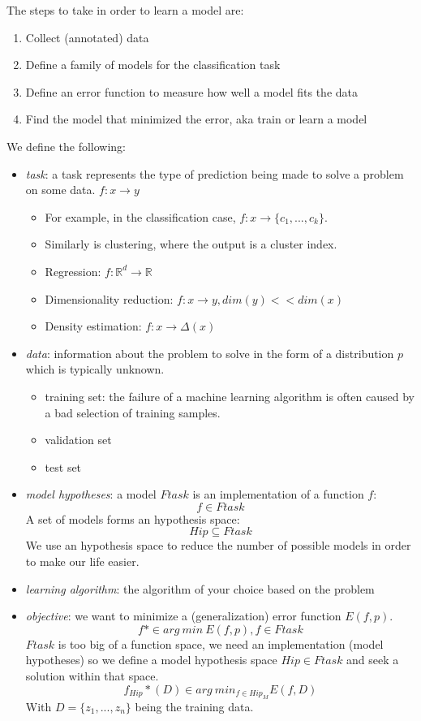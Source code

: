 \documentclass{article}
\begin{document}
The steps to take in order to learn a model are:

\begin{enumerate}
\def\labelenumi{\arabic{enumi}.}
\tightlist
\item
  Collect (annotated) data
\item
  Define a family of models for the classification task
\item
  Define an error function to measure how well a model fits the data
\item
  Find the model that minimized the error, aka train or learn a model
\end{enumerate}

We define the following:

\begin{itemize}
\tightlist
\item
  \emph{task}: a task represents the type of prediction being made to
  solve a problem on some data. \(f: x \rightarrow y\)

  \begin{itemize}
  \tightlist
  \item
    For example, in the classification case,
    \(f: x \rightarrow \{c_1, ..., c_k \}\).
  \item
    Similarly is clustering, where the output is a cluster index.
  \item
    Regression: \(f: \mathbb{R}^d \rightarrow \mathbb{R}\)
  \item
    Dimensionality reduction: \(f: x \rightarrow y, dim(y) << dim(x)\)
  \item
    Density estimation: \(f: x \rightarrow \Delta (x)\)
  \end{itemize}
\item
  \emph{data}: information about the problem to solve in the form of a
  distribution \(p\) which is typically unknown.

  \begin{itemize}
  \tightlist
  \item
    training set: the failure of a machine learning algorithm is often
    caused by a bad selection of training samples.
  \item
    validation set
  \item
    test set
  \end{itemize}
\item
  \emph{model hypotheses}: a model \(Ftask\) is an implementation of a
  function \(f\): \[f \in Ftask\] A set of models forms an hypothesis
  space: \[Hip \subseteq Ftask\] We use an hypothesis space to reduce
  the number of possible models in order to make our life easier.
\item
  \emph{learning algorithm}: the algorithm of your choice based on the
  problem
\item
  \emph{objective}: we want to minimize a (generalization) error
  function \(E(f, p)\). \[f* \in arg\ min\ E(f,p), f \in Ftask\]
  \(Ftask\) is too big of a function space, we need an implementation
  (model hypotheses) so we define a model hypothesis space
  \(Hip \in Ftask\) and seek a solution within that space.
  \[f_{Hip}*(D) \in arg\ min_{f \in Hip_M} E(f, D)\] With
  \(D=\{z_1, ..., z_n\}\) being the training data.
\end{itemize}
\end{document}
